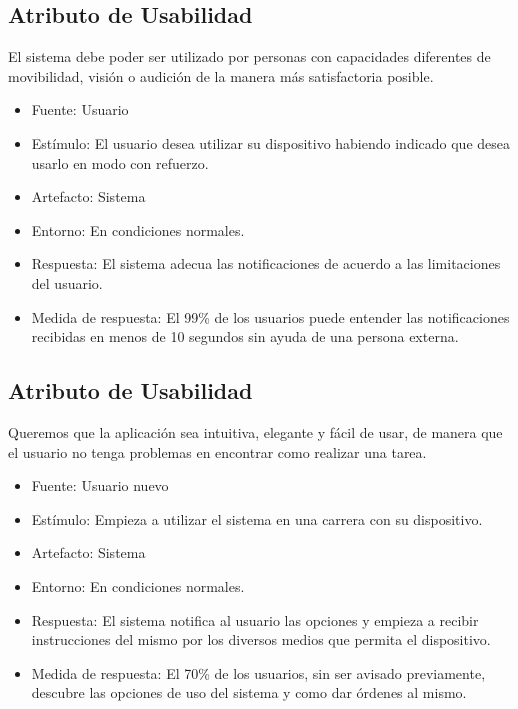 \subsection{Atributo de Usabilidad}

El sistema debe poder ser utilizado por personas con capacidades
diferentes de movibilidad, visión o audición de la manera más
satisfactoria posible.

\begin{itemize}
\itemsep1pt\parskip0pt
\item
  Fuente: Usuario
\item
  Estímulo: El usuario desea utilizar su dispositivo habiendo indicado
  que desea usarlo en modo con refuerzo.
\item
  Artefacto: Sistema
\item
  Entorno: En condiciones normales.
\item
  Respuesta: El sistema adecua las notificaciones de acuerdo a las
  limitaciones del usuario.
\item
  Medida de respuesta: El 99\% de los usuarios puede entender las
  notificaciones recibidas en menos de 10 segundos sin ayuda de una
  persona externa.
\end{itemize}

\subsection{Atributo de Usabilidad}

Queremos que la aplicación sea intuitiva, elegante y fácil de usar, de
manera que el usuario no tenga problemas en encontrar como realizar una
tarea.

\begin{itemize}
\itemsep1pt\parskip0pt
\item
  Fuente: Usuario nuevo
\item
  Estímulo: Empieza a utilizar el sistema en una carrera con su
  dispositivo.
\item
  Artefacto: Sistema
\item
  Entorno: En condiciones normales.
\item
  Respuesta: El sistema notifica al usuario las opciones y empieza a
  recibir instrucciones del mismo por los diversos medios que permita el
  dispositivo.
\item
  Medida de respuesta: El 70\% de los usuarios, sin ser avisado
  previamente, descubre las opciones de uso del sistema y como dar
  órdenes al mismo.
\end{itemize}

